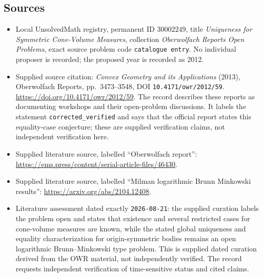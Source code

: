 \documentclass[11pt]{article}
\begin{document}
\subsection{Sources}
\begin{itemize}
\item Local UnsolvedMath registry, permanent ID \(30002249\), title \emph{Uniqueness for Symmetric Cone-Volume Measures}, collection \emph{Oberwolfach Reports Open Problems}, exact source problem code \texttt{catalogue entry}. No individual proposer is recorded; the proposed year is recorded as 2012.
\item Supplied source citation: \emph{Convex Geometry and its Applications} (2013), Oberwolfach Reports, pp.\ 3473--3548, DOI \texttt{10.4171/owr/2012/59}. \url{https://doi.org/10.4171/owr/2012/59}. The record describes these reports as documenting workshops and their open-problem discussions. It labels the statement \texttt{corrected\_verified} and says that the official report states this equality-case conjecture; these are supplied verification claims, not independent verification here.
\item Supplied literature source, labelled ``Oberwolfach report'': \url{https://ems.press/content/serial-article-files/46430}.
\item Supplied literature source, labelled ``Milman logarithmic Brunn Minkowski results'': \url{https://arxiv.org/abs/2104.12408}.
\item Literature assessment dated exactly \texttt{2026-08-21}: the supplied curation labels the problem open and states that existence and several restricted cases for cone-volume measures are known, while the stated global uniqueness and equality characterization for origin-symmetric bodies remains an open logarithmic Brunn--Minkowski type problem. This is supplied dated curation derived from the OWR material, not independently verified. The record requests independent verification of time-sensitive status and cited claims.
\end{itemize}
\end{document}
